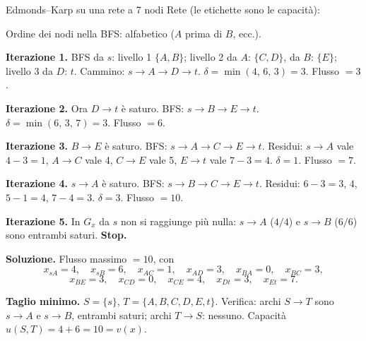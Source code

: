 \documentclass[11pt,a4paper]{article}
\begin{document}
\begin{es}{Edmonds--Karp su una rete a 7 nodi}
Rete (le etichette sono le capacità):

\begin{center}
\end{center}

Ordine dei nodi nella BFS: alfabetico ($A$ prima di $B$, ecc.).

\medskip
\textbf{Iterazione 1.} BFS da $s$: livello 1 $\{A, B\}$; livello 2 da $A$: $\{C, D\}$,
da $B$: $\{E\}$; livello 3 da $D$: $t$.
Cammino: $s \to A \to D \to t$. \quad
$\delta = \min(4,\,6,\,3) = 3$. \quad Flusso $= 3$.

\textbf{Iterazione 2.} Ora $D\to t$ è saturo. BFS: $s\to B \to E \to t$. \quad
$\delta = \min(6,\,3,\,7) = 3$. \quad Flusso $= 6$.

\textbf{Iterazione 3.} $B\to E$ è saturo. BFS: $s\to A \to C \to E \to t$.
Residui: $s\to A$ vale $4-3=1$, $A\to C$ vale 4, $C\to E$ vale 5, $E\to t$ vale $7-3=4$. \quad
$\delta = 1$. \quad Flusso $= 7$.

\textbf{Iterazione 4.} $s\to A$ è saturo. BFS: $s\to B \to C \to E \to t$.
Residui: $6-3=3$, $4$, $5-1=4$, $7-4=3$. \quad $\delta = 3$. \quad Flusso $= 10$.

\textbf{Iterazione 5.} In $G_x$ da $s$ non si raggiunge più nulla: $s\to A$ ($4/4$) e
$s\to B$ ($6/6$) sono entrambi saturi. \textbf{Stop.}

\medskip
\textbf{Soluzione.} Flusso massimo $= 10$, con
\[
x_{sA}=4,\quad x_{sB}=6,\quad x_{AC}=1,\quad x_{AD}=3,\quad x_{BA}=0,\quad x_{BC}=3,
\]
\[
x_{BE}=3,\quad x_{CD}=0,\quad x_{CE}=4,\quad x_{Dt}=3,\quad x_{Et}=7.
\]

\textbf{Taglio minimo.} $S = \{s\}$, $T = \{A,B,C,D,E,t\}$.
Verifica: archi $S \to T$ sono $s\to A$ e $s\to B$, entrambi saturi;
archi $T \to S$: nessuno. Capacità $u(S,T) = 4 + 6 = 10 = v(x)$. \checkmark
\end{es}
\end{document}
